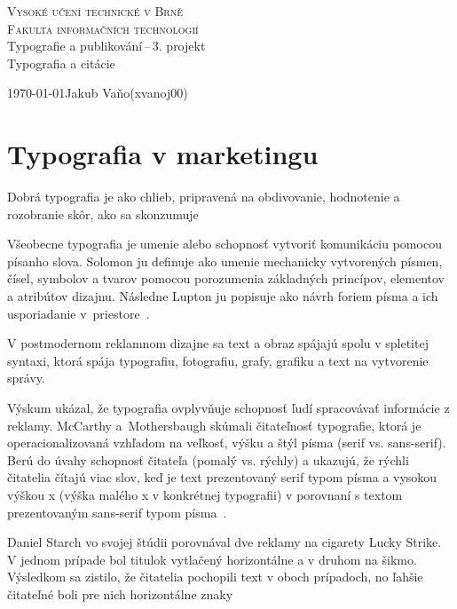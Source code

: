 \documentclass[11pt,a4paper]{article}
\begin{document}
\begin{titlepage}
\begin{center}
    \Huge\textsc{Vysoké učení technické v Brně}\\
    \huge\textsc{Fakulta informačních technologií}\\
    \LARGE{Typografie a publikování\,--\,3. projekt\\}
    \Huge{Typografia a citácie\\}
\end{center}
{\Large \today \hfill Jakub Vaňo(xvanoj00)}
\end{titlepage}

\section*{Typografia v marketingu}


Dobrá typografia je ako chlieb, pripravená na obdivovanie, hodnotenie a rozobranie skôr, ako sa skonzumuje~\cite{book-bringhurst}


Všeobecne typografia je umenie alebo schopnosť vytvoriť komunikáciu pomocou písanho slova. Solomon ju
definuje ako umenie mechanicky vytvorených písmen, čísel, symbolov a tvarov pomocou porozumenia
základných princípov, elementov a atribútov dizajnu. Následne Lupton ju popisuje ako návrh foriem písma a ich usporiadanie v~priestore~\cite{el-thangaraj}.


V postmodernom reklamnom dizajne sa text a obraz spájajú spolu v spletitej syntaxi, ktorá spája typografiu, fotografiu, grafy, grafiku a text na vytvorenie správy.~\cite{mag-bartal}


Výskum ukázal, že typografia ovplyvňuje schopnosť ľudí spracovávať informácie z reklamy. McCarthy a~Mothersbaugh skúmali čitateľnosť typografie, ktorá je operacionalizovaná vzhľadom na veľkosť, výšku a štýl písma (serif vs. sans-serif).  Berú do úvahy schopnosť čitateľa (pomalý vs. rýchly) a ukazujú, že rýchli čitatelia čítajú viac slov, keď je text prezentovaný serif typom písma a vysokou výškou x (výška malého x v konkrétnej typografii) v porovnaní s textom prezentovaným sans-serif typom písma~\cite{el-amar}.


Daniel Starch vo svojej štúdii porovnával dve reklamy na cigarety Lucky Strike. V
jednom prípade bol titulok vytlačený horizontálne a v druhom na šikmo. Výsledkom sa
zistilo, že čitatelia pochopili text v oboch prípadoch, no ľahšie čitateľné boli pre nich
horizontálne znaky~\cite{thesis-suppenova}
\end{document}
